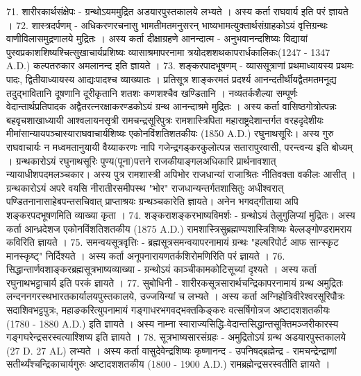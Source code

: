 71. शारीरकार्थसंक्षेपः -
ग्रन्थोऽयममुद्रित अडयारपुस्तकालये लभ्यते । अस्य कर्ता राघवार्य इति परं ज्ञायते । 
72. शास्त्रदर्पणम् -
अधिकरणरचनासु भामतीमतमनुसरन् भाष्यभामत्युक्तार्थसंग्राहकोऽयं वृत्तिग्रन्थः वाणीविलासमुद्रणालये मुद्रितः । अस्य कर्ता दीक्षाग्रहणे आनन्दात्म - अनुभवानन्दशिष्यः विद्यायां पुस्वप्रकाशशिष्यश्चित्सुखाचार्यप्रशिष्यः व्यासाश्रमापरनामा त्रयोदशशथकापरार्धकालिकः(1247 - 1347 A.D.) कल्पतरुकार अमलानन्द इति ज्ञायते । 
73. शङ्करपादभूषणम् -
व्याससूत्राणां प्रथमाध्यायस्य प्रथमः पादः, द्वितीयाध्यायस्य आद्यःपादश्च व्याख्यातः । प्रतिसूत्र शाङ्करमतं प्रदर्श्य आनन्दतीर्थीयद्वैतमतमनूद्य तदुद्भावितानि दूषणानि दूरीकृतानि शतशः कणशश्चैव खण्डितानि । नव्यतर्कशैल्या सम्पूर्णः वेदान्तार्थप्रतिपादक अद्वैतरत्नरक्षाकरण्डकोऽयं ग्रन्थ आनन्दाश्रमे मुद्रितः । अस्य कर्ता वासिष्ठगोत्रोत्पन्नः बहवृचशाखाध्यायी आश्वलायनसृत्री रामचन्द्रसूरिपुत्रः रामशास्त्रिपिता महाराष्ट्रदेशान्तर्गत वरहदृदेशीयः मीमांसान्यायपञ्चास्याराघवाचार्यशिष्यः एकोनविंशतिशतकीयः (1850 A.D.) रघुनाथसूरिः। अस्य गुरु राघवाचार्यः न मध्वमतानुयायी वैय्याकरणः नापि गजेन्द्रगड्करकुलोत्पन्न सतारापुरवासी, परन्त्वन्य इति बोध्यम् । ग्रन्थकारोऽयं रघुनाथसूरिः पुण्य(पूना)पत्तने राजकीयाङ्गलअधिकारि प्रार्थनावशात् न्यायाधीशपदमलञ्चकार। अस्य पुत्र रामशास्त्री अपिभोर राजधान्यां राजाश्रितः नीतिवक्ता वकीलः आसीत् । ग्रन्थकारोऽयं अपरे वयसि नीरातीरसमीपस्थ "भोर" राजधान्यन्तर्गतशासितुः अधीश्वरात् पण्डितनानासाहेबपन्तसचिवात् प्राप्ताश्रयः ग्रन्थञ्चकारेति ज्ञायते। अनेन भगवद्गीताया अपि शङ्करपदभूषणमिति व्याख्या कृता । 
74. शङ्कराशङ्करभाष्यविमर्शः -
ग्रन्थोऽयं तेलुगुलिप्यां मुद्रितः। अस्य कर्ता आन्ध्रदेशज एकोनविंशतिशतकीय (1875 A.D.) रामशास्त्रिसुब्रह्मण्यशास्त्रिशिष्यः बेल्लङ्गोण्डरामराय कविरिति ज्ञायते । 
75. समन्वयसूत्रवृत्तिः -
ब्रह्मसूत्रसमन्वयापरनामायं ग्रन्थः "हल्षरिपोर्ट आफ सान्स्कृट मानस्कृष्ट्" निर्दिश्यते । अस्य कर्ता अनूपनारायणतर्कशिरोमणिरिति परं ज्ञायते । 
76. सिद्धान्तार्णवशाङ्करब्रह्मसूत्रभाष्यव्याख्या - ग्रन्थोऽयं काञ्चीकामकोटिसूच्यां दृश्यते । अस्य कर्ता रघुनाथभट्टाचार्य इति परकं ज्ञायते । 
77. सुबोधिनी -
शारीरकसूत्रसारार्थचन्द्रिकापरनामायं ग्रन्थ अमुद्रितः लन्दननगरस्थभारतकार्यालयपुस्तकालये, उज्जयिन्यां च लभ्यते । अस्य कर्ता अग्निहोत्रिवीरेश्वरसूरिपौत्रः सदाशिवभट्टपुत्रः, महाङकरित्युपनामायं गङ्गाधरभगवद्भक्तकिङ्करः वत्सर्षिगोत्रज अष्टादशशतकीयः (1780 - 1880 A.D.) इति ज्ञायते । अस्य नाम्ना स्वाराज्यसिद्धि-वेदान्तसिद्धान्तसूक्तिमञ्जरीकारस्य गङ्गघरेन्द्रसरस्वत्याश्शिष्य इति ज्ञायते । 
78. सूत्रभाष्यसारसंग्रहः -
अमुद्रितोऽयं ग्रन्थ अडयारपुस्तकालये (27 D. 27 AL) लभ्यते । अस्य कर्ता वासुदेवेन्द्रशिष्यः कृष्णानन्द - उपनिषद्ब्रह्मेन्द्र - रामचन्द्रेन्द्राणां सतीर्थ्यंश्चन्द्रिकाचार्यगुरुः अष्टादशशतकीय (1800 - 1900 A.D.) रामब्रह्मेन्द्रसरस्वतीति ज्ञायते । 
